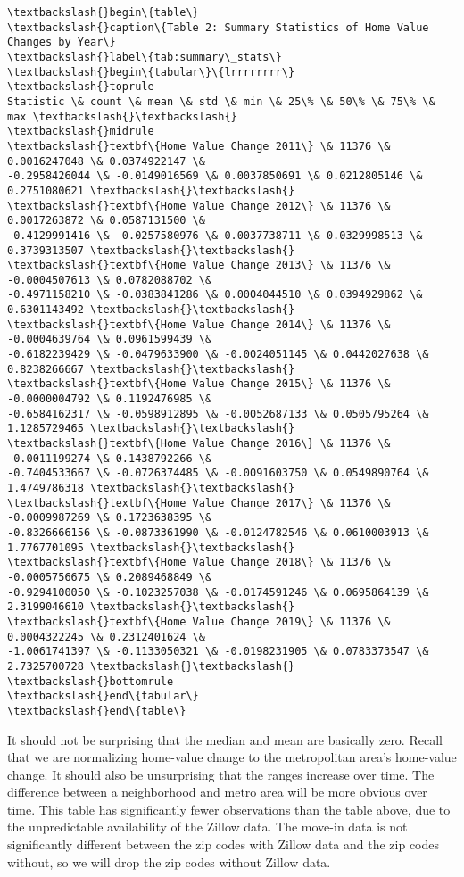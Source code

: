 \documentclass[11pt]{article}
\begin{document}
    \begin{Verbatim}[commandchars=\\\{\}]
\textbackslash{}begin\{table\}
\textbackslash{}caption\{Table 2: Summary Statistics of Home Value Changes by Year\}
\textbackslash{}label\{tab:summary\_stats\}
\textbackslash{}begin\{tabular\}\{lrrrrrrrr\}
\textbackslash{}toprule
Statistic \& count \& mean \& std \& min \& 25\% \& 50\% \& 75\% \& max \textbackslash{}\textbackslash{}
\textbackslash{}midrule
\textbackslash{}textbf\{Home Value Change 2011\} \& 11376 \& 0.0016247048 \& 0.0374922147 \&
-0.2958426044 \& -0.0149016569 \& 0.0037850691 \& 0.0212805146 \& 0.2751080621 \textbackslash{}\textbackslash{}
\textbackslash{}textbf\{Home Value Change 2012\} \& 11376 \& 0.0017263872 \& 0.0587131500 \&
-0.4129991416 \& -0.0257580976 \& 0.0037738711 \& 0.0329998513 \& 0.3739313507 \textbackslash{}\textbackslash{}
\textbackslash{}textbf\{Home Value Change 2013\} \& 11376 \& -0.0004507613 \& 0.0782088702 \&
-0.4971158210 \& -0.0383841286 \& 0.0004044510 \& 0.0394929862 \& 0.6301143492 \textbackslash{}\textbackslash{}
\textbackslash{}textbf\{Home Value Change 2014\} \& 11376 \& -0.0004639764 \& 0.0961599439 \&
-0.6182239429 \& -0.0479633900 \& -0.0024051145 \& 0.0442027638 \& 0.8238266667 \textbackslash{}\textbackslash{}
\textbackslash{}textbf\{Home Value Change 2015\} \& 11376 \& -0.0000004792 \& 0.1192476985 \&
-0.6584162317 \& -0.0598912895 \& -0.0052687133 \& 0.0505795264 \& 1.1285729465 \textbackslash{}\textbackslash{}
\textbackslash{}textbf\{Home Value Change 2016\} \& 11376 \& -0.0011199274 \& 0.1438792266 \&
-0.7404533667 \& -0.0726374485 \& -0.0091603750 \& 0.0549890764 \& 1.4749786318 \textbackslash{}\textbackslash{}
\textbackslash{}textbf\{Home Value Change 2017\} \& 11376 \& -0.0009987269 \& 0.1723638395 \&
-0.8326666156 \& -0.0873361990 \& -0.0124782546 \& 0.0610003913 \& 1.7767701095 \textbackslash{}\textbackslash{}
\textbackslash{}textbf\{Home Value Change 2018\} \& 11376 \& -0.0005756675 \& 0.2089468849 \&
-0.9294100050 \& -0.1023257038 \& -0.0174591246 \& 0.0695864139 \& 2.3199046610 \textbackslash{}\textbackslash{}
\textbackslash{}textbf\{Home Value Change 2019\} \& 11376 \& 0.0004322245 \& 0.2312401624 \&
-1.0061741397 \& -0.1133050321 \& -0.0198231905 \& 0.0783373547 \& 2.7325700728 \textbackslash{}\textbackslash{}
\textbackslash{}bottomrule
\textbackslash{}end\{tabular\}
\textbackslash{}end\{table\}

    \end{Verbatim}

    It should not be surprising that the median and mean are basically zero.
Recall that we are normalizing home-value change to the metropolitan
area's home-value change. It should also be unsurprising that the ranges
increase over time. The difference between a neighborhood and metro area
will be more obvious over time. This table has significantly fewer
observations than the table above, due to the unpredictable availability
of the Zillow data. The move-in data is not significantly different
between the zip codes with Zillow data and the zip codes without, so we
will drop the zip codes without Zillow data.
\end{document}
